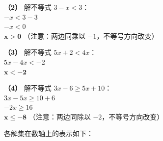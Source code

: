 \documentclass[12pt, a4paper]{ctexrep}
\begin{document}
\textbf{（2）} 解不等式 $3-x < 3$：\\
\hspace*{0.8cm} $-x < 3 - 3$\\
\hspace*{0.8cm} $-x < 0$\\
\hspace*{0.8cm} $\boldsymbol{x > 0}$ （注意：两边同乘以 $-1$，不等号方向改变）

\textbf{（3）} 解不等式 $5x+2 < 4x$：\\
\hspace*{0.8cm} $5x - 4x < -2$\\
\hspace*{0.8cm} $\boldsymbol{x < -2}$

\textbf{（4）} 解不等式 $3x-6 \geqslant 5x+10$：\\
\hspace*{0.8cm} $3x - 5x \geqslant 10 + 6$\\
\hspace*{0.8cm} $-2x \geqslant 16$\\
\hspace*{0.8cm} $\boldsymbol{x \leqslant -8}$ （注意：两边同除以 $-2$，不等号方向改变）

\vspace{0.4cm}
各解集在数轴上的表示如下：

\vspace{0.4cm}
\end{document}
